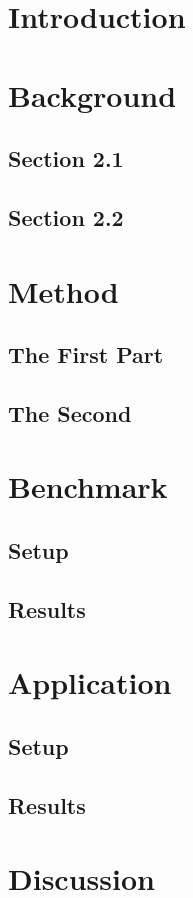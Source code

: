 \section{Introduction}
    

\section{Background}
	\subsection{Section 2.1}\label{sec:back1}	
	    
	\subsection{Section 2.2}\label{sec:back2}	
        
	
\section{Method}
	\subsection{The First Part}\label{sec:method1}	
	    
	\subsection{The Second}\label{sec:method2}	
        
        
\section{Benchmark}
	\subsection{Setup}\label{sec:bench1}	
	    
	\subsection{Results}\label{sec:bench2}	
        

\section{Application}
	\subsection{Setup}\label{sec:app1}	
	    
	\subsection{Results}\label{sec:app2}	
        
        
\section{Discussion}
                